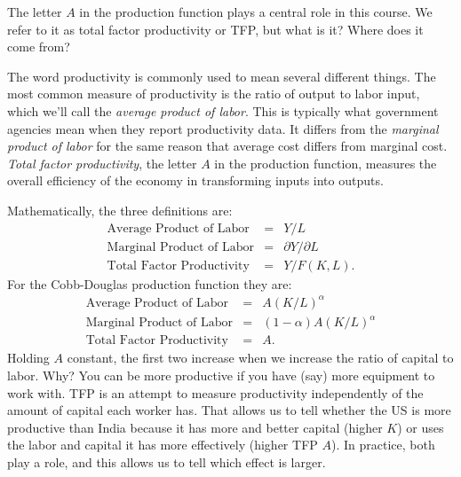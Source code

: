 The letter $A$ in the production function plays a central role
in this course. We refer to it as total factor productivity or TFP,
but what is it?  Where does it come from?


The word productivity is commonly used to mean several different
things. The most common measure of productivity is the ratio of
output to labor input, which we'll call the {\it average product
of labor\/}. This is typically what government agencies mean when
they report productivity data.  It differs from the {\it marginal
product of labor\/} for the same reason that average cost differs
from marginal cost. {\it Total factor productivity\/},
the letter $A$ in the production function, measures the overall
efficiency of the economy in transforming inputs into outputs.

Mathematically, the three definitions are:
\begin{eqnarray*}
    \mbox{Average Product of Labor} &=& {Y}/{ L} \\
    \mbox{Marginal Product of Labor} &=& {\partial Y}/{\partial L}\\
    \mbox{Total Factor Productivity} &=& {Y}/{ F(K,L)} .
\end{eqnarray*}
For the Cobb-Douglas production function they are:
\begin{eqnarray*}
    \mbox{Average Product of Labor} &=& A \left({K}/{L}\right)^\alpha  \\
    \mbox{Marginal Product of Labor} &=& (1-\alpha) A \left({K}/{L}\right)^\alpha \\
    \mbox{Total Factor Productivity} &=& A  .
\end{eqnarray*}
Holding $A$ constant,
the first two increase when we increase the ratio of capital to labor.
Why?
You can be more productive if you have
(say) more equipment to work with.
TFP is an attempt to measure productivity independently
of the amount of capital each worker has.
That allows us to tell whether the US is more productive
than India because it has more and better capital (higher $K$)
or uses the labor and capital it has more effectively (higher TFP $A$).
In practice, both play a role,
and this allows us to tell which effect is larger.



